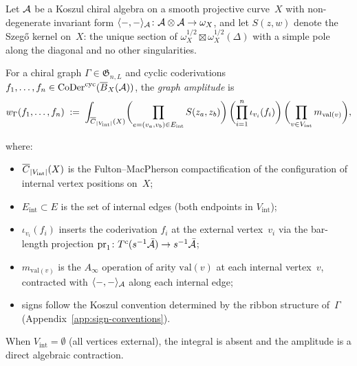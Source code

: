 \begin{definition}\label{def:graph-amplitude}
Let $\mathcal{A}$ be a Koszul chiral algebra on a smooth projective curve~$X$
with non-degenerate invariant form
$\langle{-},{-}\rangle_{\mathcal{A}}\colon \mathcal{A}\otimes\mathcal{A}\to\omega_X$,
and let $S(z,w)$ denote the Szeg\H{o} kernel on~$X$: the unique
section of
$\omega_X^{1/2} \boxtimes \omega_X^{1/2}(\Delta)$
with a simple pole along the diagonal and no other singularities.

For a chiral graph $\Gamma \in \mathfrak{G}_{n,L}$ and cyclic
coderivations $f_1, \ldots, f_n \in
\operatorname{CoDer}^{\mathrm{cyc}}(\overline{B}_X(\mathcal{A}))$, the
\emph{graph amplitude} is
\begin{equation}\label{eq:graph-amplitude}
w_\Gamma(f_1, \ldots, f_n)
\;:=\;
\int_{\overline{C}_{|V_{\mathrm{int}}|}(X)}
\biggl(\prod_{e = (v_a, v_b) \in E_{\mathrm{int}}}
  S(z_a, z_b)\biggr)
\,\biggl(\prod_{i=1}^{n} \iota_{v_i}(f_i)\biggr)
\,\biggl(\prod_{v \in V_{\mathrm{int}}} m_{\mathrm{val}(v)}\biggr),
\end{equation}

where:

\begin{itemize}
\item $\overline{C}_{|V_{\mathrm{int}}|}(X)$ is the Fulton--MacPherson
  compactification of the configuration of internal vertex positions
  on~$X$;
\item $E_{\mathrm{int}} \subset E$ is the set of internal edges
  (both endpoints in $V_{\mathrm{int}}$);
\item $\iota_{v_i}(f_i)$ inserts the coderivation $f_i$ at the
  external vertex~$v_i$ via the bar-length projection
  $\operatorname{pr}_1\colon T^c(s^{-1}\bar{\mathcal{A}}) \to
  s^{-1}\bar{\mathcal{A}}$;
\item $m_{\mathrm{val}(v)}$ is the $A_\infty$ operation of
  arity $\mathrm{val}(v)$ at each internal vertex~$v$, contracted
  with $\langle{-},{-}\rangle_{\mathcal{A}}$ along each internal edge;
\item signs follow the Koszul convention determined by the ribbon
  structure of~$\Gamma$
  (Appendix~\ref{app:sign-conventions}).
\end{itemize}
When $V_{\mathrm{int}} = \emptyset$ (all vertices external), the
integral is absent and the amplitude is a direct algebraic contraction.
\end{definition}

